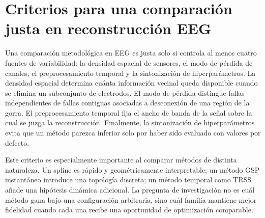 \section{Criterios para una comparación justa en reconstrucción EEG}
Una comparación metodológica en EEG es justa solo si controla al menos cuatro fuentes de variabilidad: la densidad espacial de sensores, el modo de pérdida de canales, el preprocesamiento temporal y la sintonización de hiperparámetros. La densidad espacial determina cuánta información vecinal queda disponible cuando se elimina un subconjunto de electrodos. El modo de pérdida distingue fallas independientes de fallas contiguas asociadas a desconexión de una región de la gorra. El preprocesamiento temporal fija el ancho de banda de la señal sobre la cual se juzga la reconstrucción. Finalmente, la sintonización de hiperparámetros evita que un método parezca inferior solo por haber sido evaluado con valores por defecto.

Este criterio es especialmente importante al comparar métodos de distinta naturaleza. Un spline es rápido y geométricamente interpretable; un método GSP instantáneo introduce una topología discreta; un método temporal como TRSS añade una hipótesis dinámica adicional. La pregunta de investigación no es cuál método gana bajo una configuración arbitraria, sino cuál familia mantiene mejor fidelidad cuando cada una recibe una oportunidad de optimización comparable.
